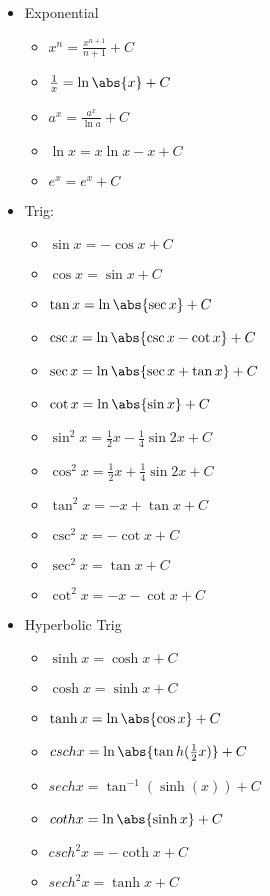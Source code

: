 \documentclass{report}
\begin{document}
     \begin{itemize}
      \item Exponential      
    \begin{itemize}
      \item $x^{n} = \frac{x^{n+1}}{n+1} + C$
      \item $\frac{1}{x} = \ln{\abs{x}} + C$
      \item $a^{x} = \frac{a^{x}}{\ln{a}} + C$
      \item $\ln{x} = x\ln{x} - x + C$
      \item $e^{x} = e^{x} + C$
    \end{itemize}
    \bigbreak \noindent \bigbreak \noindent
  \item Trig:
    \begin{itemize}
      \item $\sin{x} = -\cos{x} +  C$
      \item $\cos{x} = \sin{x} + C$
      \item $\tan{x} = \ln{\abs{\sec{x}}} + C$
      \item $\csc{x} = \ln{\abs{\csc{x}-\cot{x}}} + C $
      \item $\sec{x}  = \ln{\abs{\sec{x}+\tan{x}}} + C$
      \item $\cot{x} = \ln{\abs{\sin{x}}} + C$
      \item $\sin^{2}{x} = \frac{1}{2}x-\frac{1}{4}\sin{2x} + C$
      \item $\cos^{2}{x}= \frac{1}{2}x+\frac{1}{4}\sin{2x} + C$
      \item $\tan^{2}{x}= -x + \tan{x} + C $
      \item $\csc^{2}{x}= -\cot{x} + C$
      \item $\sec^{2}{x} =\tan{x} + C$
      \item $\cot^{2}{x} =-x  - \cot{x} + C$
    \end{itemize}
    \bigbreak \noindent \bigbreak \noindent
  \item Hyperbolic Trig
    \begin{itemize}
      \item $\sinh{x} = \cosh{x} + C$
      \item $\cosh{x} = \sinh{x} + C$ 
      \item $\tanh{x} = \ln{\abs{\cos{x}}} + C$
      \item $csch{x} =  \ln{\abs{\tan{h}(\frac{1}{2}x)}} + C$ 
      \item $sech{x} = \tan^{-1}{(\sinh{(x)})} + C$
      \item $coth{x}= \ln{\abs{\sinh{x}}} + C $
      \item $csch^{2}{x} = -\coth{x}+ C$
      \item $sech^{2}{x} = \tanh{x} + C$
    \end{itemize}
    \end{itemize}
\end{document}
